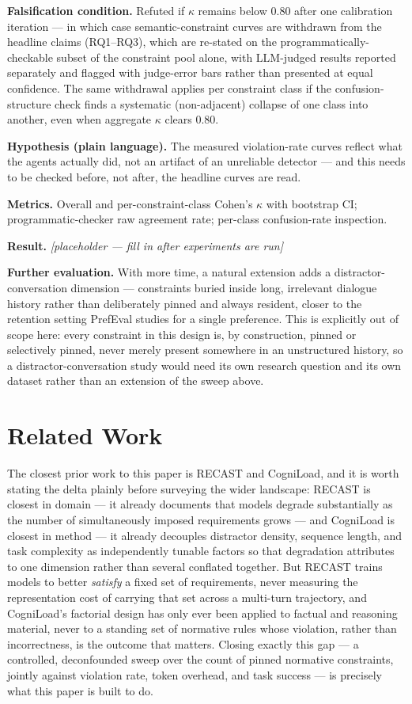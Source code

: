 \documentclass[11pt]{article}
\newcommand{\ph}{\textit{[placeholder --- fill in after experiments are run]}}
\begin{document}
\textbf{Falsification condition.} Refuted if $\kappa$ remains below 0.80 after one calibration iteration --- in which case semantic-constraint curves are withdrawn from the headline claims (RQ1--RQ3), which are re-stated on the programmatically-checkable subset of the constraint pool alone, with LLM-judged results reported separately and flagged with judge-error bars rather than presented at equal confidence. The same withdrawal applies per constraint class if the confusion-structure check finds a systematic (non-adjacent) collapse of one class into another, even when aggregate $\kappa$ clears 0.80.

\textbf{Hypothesis (plain language).} The measured violation-rate curves reflect what the agents actually did, not an artifact of an unreliable detector --- and this needs to be checked before, not after, the headline curves are read.

\textbf{Metrics.} Overall and per-constraint-class Cohen's $\kappa$ with bootstrap CI; programmatic-checker raw agreement rate; per-class confusion-rate inspection.

\textbf{Result.} \ph

\vspace{0.5em}
\noindent\textbf{Further evaluation.} With more time, a natural extension adds a distractor-conversation dimension --- constraints buried inside long, irrelevant dialogue history rather than deliberately pinned and always resident, closer to the retention setting PrefEval studies for a single preference. This is explicitly out of scope here: every constraint in this design is, by construction, pinned or selectively pinned, never merely present somewhere in an unstructured history, so a distractor-conversation study would need its own research question and its own dataset rather than an extension of the sweep above.

\section{Related Work}

The closest prior work to this paper is RECAST and CogniLoad, and it is worth stating the delta plainly before surveying the wider landscape: RECAST is closest in domain --- it already documents that models degrade substantially as the number of simultaneously imposed requirements grows --- and CogniLoad is closest in method --- it already decouples distractor density, sequence length, and task complexity as independently tunable factors so that degradation attributes to one dimension rather than several conflated together. But RECAST trains models to better \emph{satisfy} a fixed set of requirements, never measuring the representation cost of carrying that set across a multi-turn trajectory, and CogniLoad's factorial design has only ever been applied to factual and reasoning material, never to a standing set of normative rules whose violation, rather than incorrectness, is the outcome that matters. Closing exactly this gap --- a controlled, deconfounded sweep over the count of pinned normative constraints, jointly against violation rate, token overhead, and task success --- is precisely what this paper is built to do.
\end{document}
